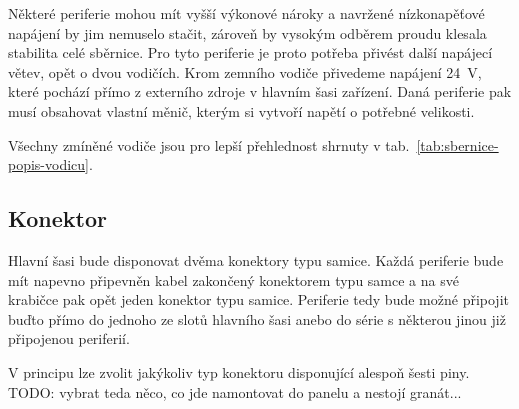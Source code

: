        Některé periferie mohou mít vyšší výkonové nároky a navržené nízkonapěťové napájení by jim nemuselo stačit, zároveň by vysokým odběrem proudu klesala stabilita celé sběrnice. Pro tyto periferie je proto potřeba přivést další napájecí větev, opět o dvou vodičích. Krom zemního vodiče přivedeme napájení \qty{24}{V}, které pochází přímo z externího zdroje v hlavním šasi zařízení. Daná periferie pak musí obsahovat vlastní měnič, kterým si vytvoří napětí o potřebné velikosti. 

        Všechny zmíněné vodiče jsou pro lepší přehlednost shrnuty v tab.~\ref{tab:sbernice-popis-vodicu}.
    
    \subsection{Konektor}
        Hlavní šasi bude disponovat dvěma konektory typu samice. Každá periferie bude mít napevno připevněn kabel zakončený konektorem typu samce a na své krabičce pak opět jeden konektor typu samice. Periferie tedy bude možné připojit buďto přímo do jednoho ze slotů hlavního šasi anebo do série s některou jinou již připojenou periferií. 
        
        V principu lze zvolit jakýkoliv typ konektoru disponující alespoň šesti piny.   TODO: vybrat teda něco, co jde namontovat do panelu a nestojí granát...